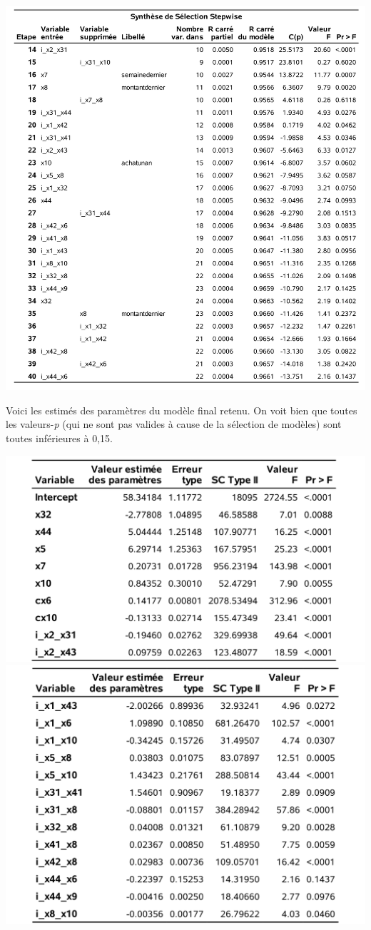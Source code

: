 \documentclass[
  11pt,
  letterpaper,
]{book}
\theoremstyle{definition}
\theoremstyle{definition}
\theoremstyle{definition}
\theoremstyle{remark}
\begin{document}
\begin{center}\includegraphics[width=0.9\linewidth]{figures/02-select-e9} \end{center}

Voici les estimés des paramètres du modèle final retenu. On voit bien que toutes les valeurs-\emph{p} (qui ne sont pas valides à cause de la sélection de modèles) sont toutes inférieures à 0,15.

\begin{center}\includegraphics[width=0.7\linewidth]{figures/02-select-e10} \includegraphics[width=0.7\linewidth]{figures/02-select-e11} \end{center}
\end{document}
